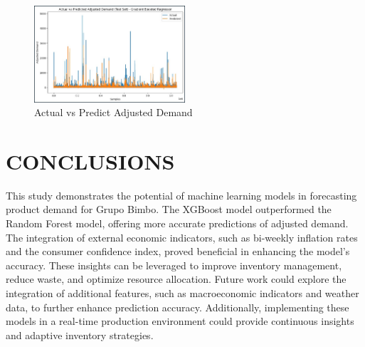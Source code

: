 \documentclass[letterpaper, 10 pt, conference]{ieeeconf}  %
\begin{document}
\begin{figure}[H] 
        \begin{center}
        \centering
        \includegraphics[width=0.5\textwidth]{images/comparisonxg.jpg}
        \caption{Actual vs Predict Adjusted Demand}
        \end{center}
\end{figure} 


\section{CONCLUSIONS}

This study demonstrates the potential of machine learning models in forecasting product demand for Grupo Bimbo. The XGBoost model outperformed the Random Forest model, offering more accurate predictions of adjusted demand. The integration of external economic indicators, such as bi-weekly inflation rates and the consumer confidence index, proved beneficial in enhancing the model's accuracy. These insights can be leveraged to improve inventory management, reduce waste, and optimize resource allocation. Future work could explore the integration of additional features, such as macroeconomic indicators and weather data, to further enhance prediction accuracy. Additionally, implementing these models in a real-time production environment could provide continuous insights and adaptive inventory strategies.


\addtolength{\textheight}{-12cm}   %

\end{document}
